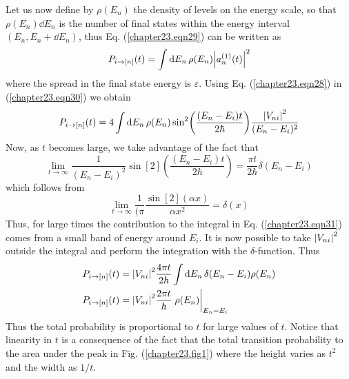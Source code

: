 Let us now define by $\rho(E_n)$ the density of levels on the energy scale, so that $\rho(E_n) \dd{E_n}$  is the number of final states within the energy interval $(E_n, E_n + \dd{E_n})$, thus Eq. (\ref{chapter23.eqn29}) can be written as
\begin{equation}
\label{chapter23.eqn30}
	P_{i \rightarrow [n]}(t) = \int \dd{E_n} \rho(E_n) \abs{a_n^{(1)}(t)}^2
\end{equation}
where the spread in the final state energy is $\varepsilon$. Using Eq. (\ref{chapter23.eqn28}) in (\ref{chapter23.eqn30}) we obtain
\begin{equation}
\label{chapter23.eqn31}
P_{i \rightarrow [n]}(t) = 4 \int \dd{E_n} \rho(E_n) \sin[2](\frac{(E_n - E_i)t}{2 \hbar}) \frac{\abs{V_{n i}}^2}{(E_n - E_i)^2}
\end{equation}
Now, as $t$ becomes large, we take advantage of the fact that
\begin{equation}
\lim\limits_{t \rightarrow \infty} \frac{1}{(E_n - E_i)^2} \sin[2](\frac{(E_n - E_i)t}{2 \hbar}) = \frac{\pi t}{2 \hbar} \delta(E_n - E_i)
\end{equation}
which follows from
\begin{equation}
\lim\limits_{t \rightarrow \infty} \frac{1}{(\pi} \frac{\sin[2](\alpha x)}{\alpha x^2} =  \delta(x)
\end{equation}
Thus, for large times the contribution to the integral in Eq. (\ref{chapter23.eqn31}) comes from a small band of energy around $E_i$. It is now possible to take $\abs{V_{n i}}^2$ outside the integral and perform the integration with the $\delta$-function. Thus
\begin{align}
P_{i \rightarrow [n]}(t) &= \abs{V_{n i}}^2 \frac{4\pi t}{2 \hbar} \int \dd{E_n} \delta(E_n - E_i)\rho(E_n)  \nonumber\\
P_{i \rightarrow [n]}(t) &= \abs{V_{n i}}^2 \frac{2\pi t}{\hbar} \eval{\rho(E_n)}_{E_n=E_i}
\label{chapter23.eqn32}
\end{align}
Thus the total probability is proportional to $t$ for large values of $t$. Notice that linearity in $t$ is a consequence of the fact that the total transition probability to the area under the peak in Fig. (\ref{chapter23.fig1}) where the height varies as $t^2$ and the width as $1/t$.

